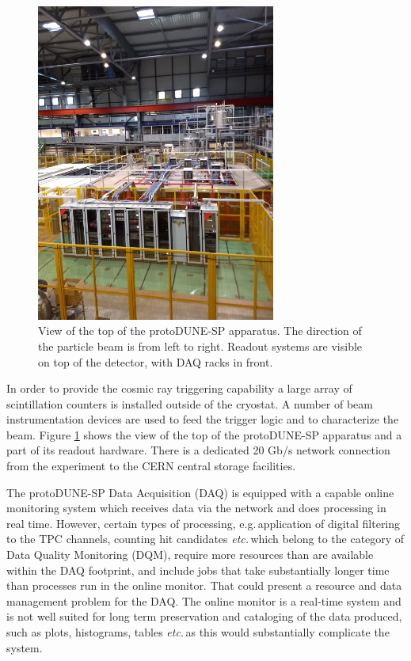 \documentclass{webofc}
\newcommand{\pd}{protoDUNE\xspace}
\begin{document}
\begin{figure}[tb]
\centering\includegraphics[width=0.7\textwidth]{figures/np04_photo_2018_v1.png}
\caption{\label{fig:np04_photo}
View of the top of the \pd-SP apparatus.
The direction of the particle beam is from left to right.
Readout systems are visible on top of the detector, with DAQ racks in front.
}
\end{figure}


In order to provide the cosmic ray triggering capability a large array of scintillation
counters is installed outside of the cryostat. A number of beam instrumentation devices
are used to feed the  trigger logic and to characterize the beam. Figure \ref{fig:np04_photo}
shows the view of the top of the \pd-SP apparatus and a part of its readout hardware.
There is a dedicated 20 Gb/s network connection from the experiment to the CERN central storage facilities.

The \pd-SP Data Acquisition (DAQ) is equipped with a capable online monitoring system
which receives data via the network and does processing in real time.
However, certain types of processing, e.g.\,application of digital filtering to the TPC channels, counting hit candidates \textit{etc.}\,which belong to the
category of Data Quality Monitoring (DQM), require more resources than are available within
the DAQ footprint, and include jobs that take substantially longer time than processes run in the
online monitor. That could present a resource and data management problem for the DAQ.
The online monitor is a real-time system and is not well suited for long term preservation and
cataloging of the data produced, such as plots, histograms, tables \textit{etc.}\,as this would
substantially complicate the system.
\end{document}
